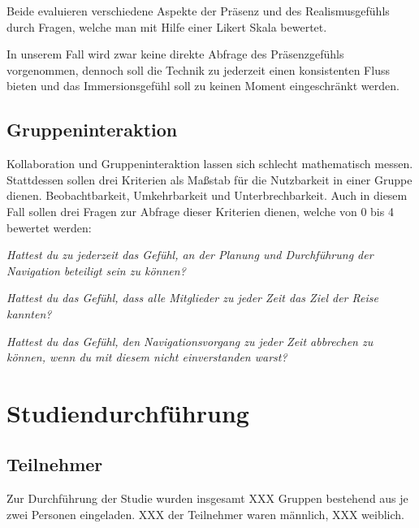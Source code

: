 Beide evaluieren verschiedene Aspekte der Präsenz und des Realismusgefühls durch Fragen, welche man mit Hilfe einer Likert Skala bewertet.

In unserem Fall wird zwar keine direkte Abfrage des Präsenzgefühls vorgenommen, dennoch soll die Technik zu jederzeit einen konsistenten Fluss bieten und das Immersionsgefühl soll zu keinen Moment eingeschränkt werden.

\subsection{Gruppeninteraktion}
Kollaboration und Gruppeninteraktion lassen sich schlecht mathematisch messen. 
Stattdessen sollen drei Kriterien als Maßstab für die Nutzbarkeit in einer Gruppe dienen.
Beobachtbarkeit, Umkehrbarkeit und Unterbrechbarkeit.
Auch in diesem Fall sollen drei Fragen zur Abfrage dieser Kriterien dienen, welche von 0 bis 4 bewertet werden:

\textit{Hattest du zu jederzeit das Gefühl, an der Planung und Durchführung der Navigation beteiligt sein zu können?}

\textit{Hattest du das Gefühl, dass alle Mitglieder zu jeder Zeit das Ziel der Reise kannten?}

\textit{Hattest du das Gefühl, den Navigationsvorgang zu jeder Zeit abbrechen zu können, wenn du mit diesem nicht einverstanden warst?}

\section{Studiendurchführung}
\subsection{Teilnehmer}
Zur Durchführung der Studie wurden insgesamt XXX Gruppen bestehend aus je zwei Personen eingeladen. XXX der Teilnehmer waren männlich, XXX weiblich.

